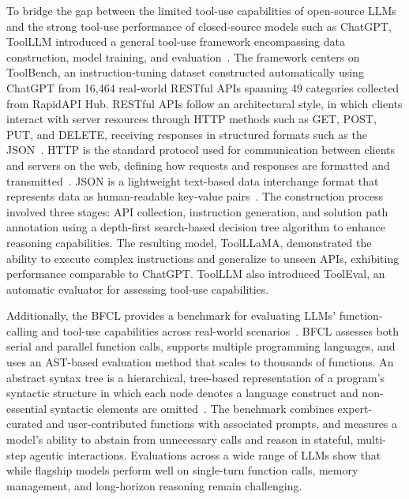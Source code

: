 \documentclass[
english,                 %
bibtex,                  %
]{kththesis}
\numberwithin{listing}{chapter}
\begin{document}
To bridge the gap between the limited tool-use capabilities of open-source \glspl{LLM} and the strong tool-use performance of closed-source models such as Chat\gls{GPT}, Tool\gls{LLM} introduced a general tool-use framework encompassing data construction, model training, and evaluation~\cite{qin_toolllm_2024}. The framework centers on ToolBench, an instruction-tuning dataset constructed automatically using Chat\gls{GPT} from 16,464 real-world \gls{REST}ful \glspl{API} spanning 49 categories collected from Rapid\gls{API} Hub. \Gls{REST}ful \glspl{API} follow an architectural style, in which clients interact with server resources through \gls{HTTP} methods such as GET, POST, PUT, and DELETE, receiving responses in structured formats such as the \gls{JSON}~\cite{fielding_architectural_2000}. \Gls{HTTP} is the standard protocol used for communication between clients and servers on the web, defining how requests and responses are formatted and transmitted~\cite{berners-lee_information_1990}. \Gls{JSON} is a lightweight text-based data interchange format that represents data as human-readable key-value pairs~\cite{crockford_applicationjson_2006}. The construction process involved three stages: \gls{API} collection, instruction generation, and solution path annotation using a depth-first search-based decision tree algorithm to enhance reasoning capabilities. The resulting model, Tool\gls{LLaMA}, demonstrated the ability to execute complex instructions and generalize to unseen \glspl{API}, exhibiting performance comparable to Chat\gls{GPT}. Tool\gls{LLM} also introduced ToolEval, an automatic evaluator for assessing tool-use capabilities.

Additionally, the \gls{BFCL} provides a benchmark for evaluating \glspl{LLM}’ function-calling and tool-use capabilities across real-world scenarios~\cite{patil_berkeley_2025}. \Gls{BFCL} assesses both serial and parallel function calls, supports multiple programming languages, and uses an \gls{AST}-based evaluation method that scales to thousands of functions. An abstract syntax tree is a hierarchical, tree-based representation of a program’s syntactic structure in which each node denotes a language construct and non-essential syntactic elements are omitted~\cite{perry_foundations_1992}. The benchmark combines expert-curated and user-contributed functions with associated prompts, and measures a model's ability to abstain from unnecessary calls and reason in stateful, multi-step agentic interactions. Evaluations across a wide range of \glspl{LLM} show that while flagship models perform well on single-turn function calls, memory management, and long-horizon reasoning remain challenging.
\end{document}
